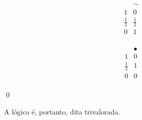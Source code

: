\begin{definicao}
    \begin{minipage}{0.5\textwidth}
        \[
            \begin{array}{c|c}
                            & \neg        \\
                \hline
                1           & 0           \\
                \frac{1}{2} & \frac{1}{2} \\
                0           & 1           \\
            \end{array}
        \]
    \end{minipage}
    \begin{minipage}{0.3\textwidth}
        \[
            \begin{array}{c|c}
                            & \bullet   \\
                \hline
                1           & 0         \\
                \frac{1}{2} & 1         \\
                0           & 0         \\
            \end{array}
        \]
    \end{minipage}

    \noindent
    \qed{}
\end{definicao}

A lógica \lfium{} é, portanto, dita trivalorada.

